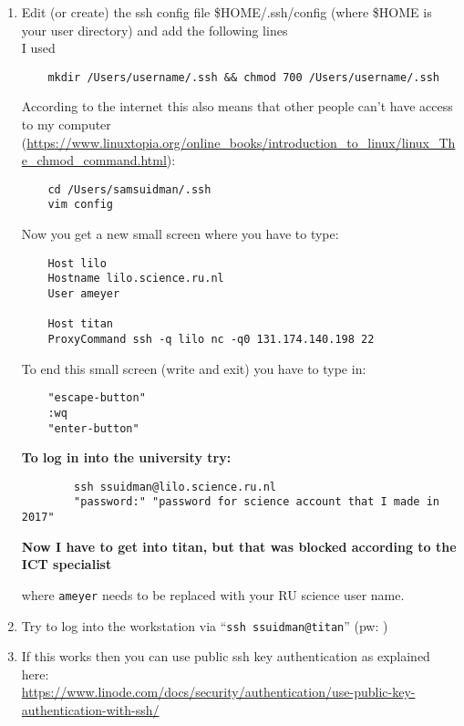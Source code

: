 \documentclass{article}
\begin{document}
\begin{enumerate}
    \item Edit (or create) the ssh config file \$HOME/.ssh/config (where \$HOME is your user directory) and add the following lines \\
    {\color{red} I used}
    \begin{verbatim}
    mkdir /Users/username/.ssh && chmod 700 /Users/username/.ssh    
    \end{verbatim}
    {\color{red} According to the internet this also means that other people can't have access to my computer} \\ (\url{https://www.linuxtopia.org/online_books/introduction_to_linux/linux_The_chmod_command.html}):
    \begin{verbatim}
    cd /Users/samsuidman/.ssh
    vim config
    \end{verbatim}
    
    Now you get a new small screen where you have to type:
    
    \begin{verbatim}
    Host lilo
    Hostname lilo.science.ru.nl
    User ameyer
    
    Host titan
    ProxyCommand ssh -q lilo nc -q0 131.174.140.198 22
    \end{verbatim}
    To end this small screen (write and exit) you have to type in:
    
    \begin{verbatim}
    "escape-button"
    :wq
    "enter-button"
    \end{verbatim}
    
    \textbf{To log in into the university try:}
    \begin{verbatim}
        ssh ssuidman@lilo.science.ru.nl
        "password:" "password for science account that I made in 2017"
    \end{verbatim}
    \textbf{Now I have to get into titan, but that was blocked according to the ICT specialist}
    
    where \texttt{ameyer} needs to be replaced with your RU science user name.

    \item Try to log into the workstation via ``\verb|ssh ssuidman@titan|'' (pw: )%

    \item If this works then you can use public ssh key authentication as explained here:\\ \url{https://www.linode.com/docs/security/authentication/use-public-key-authentication-with-ssh/}
\end{enumerate}
\end{document}

